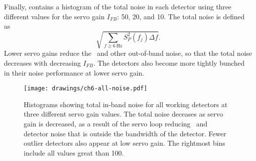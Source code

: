 Finally,  contains a histogram of the total noise in each detector using three different values for the servo gain $I_{FB}$: 50, 20, and 10.
The total noise is defined as
\begin{equation} \label{eqn:ch6-tot-noise-defn}
  \sqrt{ \sum_{f \ge \SI{6}{\hertz}} S^2_P(f_j) \Delta f}.
\end{equation}
Lower servo gains reduce the \SQUID\ and other out-of-band noise, so that the total noise decreases with decreasing $I_{FB}$.
The detectors also become more tightly bunched in their noise performance at lower servo gain.

\begin{figure*}
  \centering
\texttt{[image: drawings/ch6-all-noise.pdf]}
\caption[Total in-band noise]{
Histograms showing total in-band noise for all working detectors at three different servo gain values.
The total noise deceases as servo gain is decreased, as a result of the servo loop reducing \SQUID\ and detector noise that is outside the bandwidth of the detector.
Fewer outlier detectors also appear at low servo gain.
The rightmost bins include all values great than \SI{100}{\fW}.}
\label{fig:ch6-all-noise}
\end{figure*}
